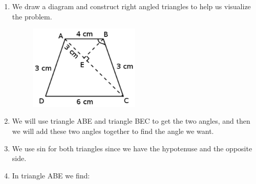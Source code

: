 {\begin{mdframed}[linewidth=4, leftmargin=40, rightmargin=40]
\begin{exercise}
\begin{enumerate}[noitemsep, label=\textbf{Step} \textbf{\arabic*}. ]
            \leftskip=20pt\rightskip=\leftskip\item 
We draw a diagram and construct right angled triangles to help us visualize the problem.
    \setcounter{subfigure}{0}
	\begin{figure}[H] %
    \begin{center}
    \label{m39408*id81601!!!underscore!!!media}\label{m39408*id81601!!!underscore!!!printimage}\includegraphics[width=200px]{col11306.imgs/m39408_q1trig.png} %
      \vspace{2pt}
    \vspace{.1in}
    \end{center}
 \end{figure}       \item We will use triangle ABE and triangle BEC to get the two angles, and then we will add these two angles together to find the angle we want.\item We use sin for both triangles since we have the hypotenuse and the opposite side.\item In triangle ABE we find:
\label{m39408*eid824}\nopagebreak\noindent{}
\end{enumerate}
\end{exercise}
\end{mdframed}}
